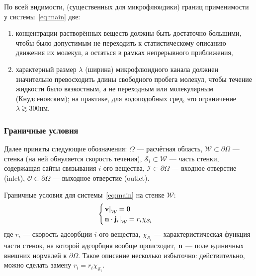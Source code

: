\documentclass[oneside,final,12pt]{extreport}
\begin{document}
По всей видимости, (существенных для микрофлюидики) границ применимости
у системы~\eqref{eq:main} две:
\begin{enumerate}
  \item концентрации растворённых веществ должны быть достаточно большими,
    чтобы было допустимым не переходить к статистическому описанию
    движения их молекул, а остаться в рамках непрерывного приближения,

  \item характерный размер $\lambda$ (ширина) микрофлюидного канала должнен
    значительно превосходить длины
    свободного пробега молекул, чтобы течение жидкости было вязкостным,
    а не переходным или молекулярным (Кнудсеновским);
    на практике, для водоподобных сред, это ограничение
    $\lambda\gtrsim300\text{нм}$.

\end{enumerate}

\subsubsection*{Граничные условия}
Далее приняты следующие обозначения: $\Omega$ --- расчётная область,
$\mathcal{W} \subset \partial\Omega$ --- стенка
(на ней обнуляется скорость течения),
$\mathcal{S}_i \subset \mathcal{W}$ --- часть стенки,
содержащая сайты связывания $i$-ого вещества,
$\mathcal{I} \subset \partial\Omega$ --- входное отверстие (inlet),
$\mathcal{O} \subset \partial\Omega$ --- выходное отверстие (outlet).

Граничные условия для системы~\eqref{eq:main} на стенке $\mathcal{W}$:
\begin{equation}
\begin{cases}
  \left. \vb v \right|_{\mathcal{W}} = \vb 0 \\
  \left. \vb n \cdot \vb j_i \right|_{\mathcal{W}} = r_i\chi_{\mathcal{S}_i}
\end{cases}
\label{eq:main:bc_walls}
\end{equation}
где $r_i$ --- скорость адсорбции $i$-ого вещества,
$\chi_{\mathcal{S}_i}$ --- характеристическая функция части стенок,
на которой адсорбция вообще происходит,
$\vb n$ --- поле единичных внешних нормалей к $\partial \Omega$.
Такое описание несколько избыточно: действительно, можно сделать замену
$r_i = r_i\chi_{\mathcal{S}_i}$.
\end{document}
